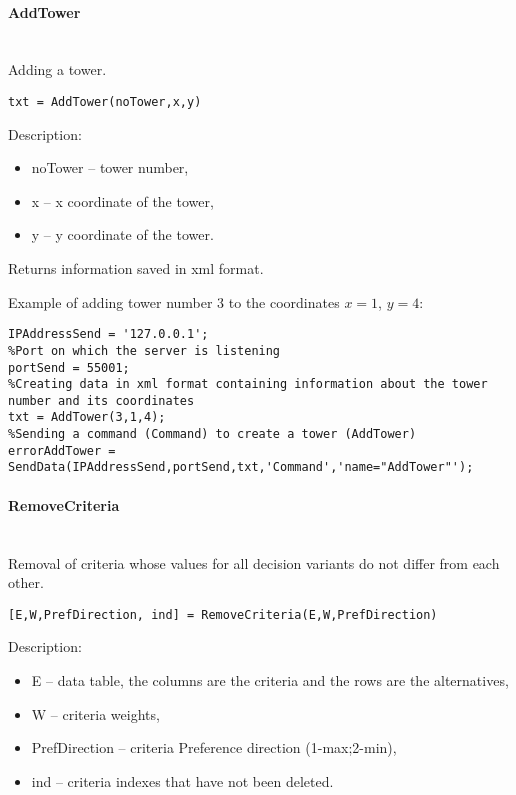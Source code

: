 \paragraph{AddTower} \hspace{0pt} \\

Adding a tower.
\begin{lstlisting}[style=Matlab-editor]
txt = AddTower(noTower,x,y)
\end{lstlisting}

Description:
\begin{itemize}
\item noTower -- tower number,
\item x -- x coordinate of the tower,
\item y -- y coordinate of the tower.
\end{itemize}

Returns information saved in xml format.

Example of adding tower number 3 to the coordinates $x=1$, $y = 4$:
\begin{lstlisting}[style=Matlab-editor]
%Server address
IPAddressSend = '127.0.0.1';
%Port on which the server is listening
portSend = 55001;
%Creating data in xml format containing information about the tower number and its coordinates
txt = AddTower(3,1,4);
%Sending a command (Command) to create a tower (AddTower)
errorAddTower = SendData(IPAddressSend,portSend,txt,'Command','name="AddTower"');
\end{lstlisting}

\paragraph{RemoveCriteria} \hspace{0pt} \\
Removal of criteria whose values for all decision variants do not differ from each other.

\begin{lstlisting}[style=Matlab-editor]
[E,W,PrefDirection, ind] = RemoveCriteria(E,W,PrefDirection)
\end{lstlisting}

Description:
\begin{itemize}
\item  E -- data table, the columns are the criteria and the rows are the alternatives,
\item  W -- criteria weights,
\item  PrefDirection -- criteria Preference direction (1-max;2-min),
\item  ind -- criteria indexes that have not been deleted.
\end{itemize}

